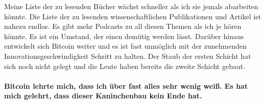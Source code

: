 Meine Liste der zu lesenden Bücher wächst schneller als ich sie jemals
abarbeiten könnte. Die Liste der zu lesenden wissenschaftlichen Publikationen
und Artikel ist nahezu endlos. Es gibt mehr Podcasts zu all diesen Themen als
ich je hören könnte. Es ist ein Umstand, der einen demütig werden lässt. Darüber
hinaus entwickelt sich Bitcoin weiter und es ist fast unmöglich mit der
zunehmenden Innovationsgeschwindigkeit Schritt zu halten. Der Staub der ersten
Schicht hat sich noch nicht gelegt und die Leute haben bereits die zweite
Schicht gebaut.

\paragraph{Bitcoin lehrte mich, dass ich über fast alles sehr wenig weiß. Es hat
mich gelehrt, dass dieser Kaninchenbau kein Ende hat.}

%
%
%
%
%
